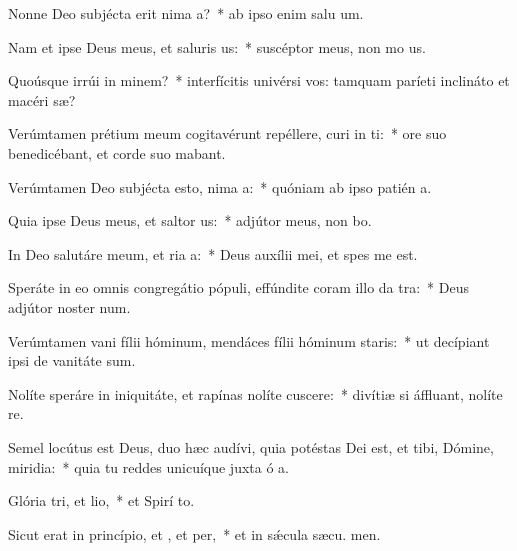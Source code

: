 \item Nonne Deo subjécta erit nima a?~* ab ipso enim salu um.
\item Nam et ipse Deus meus, et saluris us:~* suscéptor meus, non mo us.
\item Quoúsque irrúi in minem?~* interfícitis univérsi vos: tamquam paríeti inclináto et macéri sæ?
\item Verúmtamen prétium meum cogitavérunt repéllere, curi in ti:~* ore suo benedicébant, et corde suo mabant.
\item Verúmtamen Deo subjécta esto, nima a:~* quóniam ab ipso patién a.
\item Quia ipse Deus meus, et saltor us:~* adjútor meus, non bo.
\item In Deo salutáre meum, et ria a:~* Deus auxílii mei, et spes me   est.
\item Speráte in eo omnis congregátio pópuli, effúndite coram illo da tra:~* Deus adjútor noster  num.
\item Verúmtamen vani fílii hóminum, mendáces fílii hóminum  staris:~* ut decípiant ipsi de vanitáte  sum.
\item Nolíte speráre in iniquitáte, et rapínas nolíte cuscere:~* divítiæ si áffluant, nolíte  re.
\item Semel locútus est Deus, duo hæc audívi, quia potéstas Dei est, et tibi, Dómine, miridia:~* quia tu reddes unicuíque juxta ó a.
\item Glória tri, et lio,~* et Spirí to.
\item Sicut erat in princípio, et , et per,~* et in sǽcula sæcu. men.

